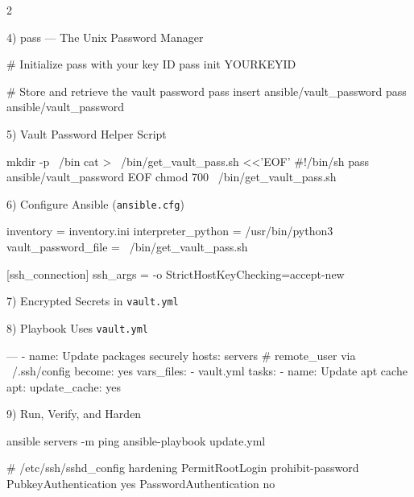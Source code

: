 \documentclass[8pt,letterpaper]{article}
\begin{document}
\begin{multicols}{2}
\begin{secbox}{4) pass --- The Unix Password Manager}
\begin{codeblock}
# Initialize pass with your key ID
pass init YOURKEYID

# Store and retrieve the vault password
pass insert ansible/vault_password
pass ansible/vault_password
\end{codeblock}
\end{secbox}

\begin{secbox}{5) Vault Password Helper Script}
\begin{codeblock}
mkdir -p ~/bin
cat > ~/bin/get_vault_pass.sh <<'EOF'
#!/bin/sh
pass ansible/vault_password
EOF
chmod 700 ~/bin/get_vault_pass.sh
\end{codeblock}
\end{secbox}

\begin{secbox}{6) Configure Ansible (\texttt{ansible.cfg})}
\begin{codeblock}
[defaults]
inventory           = inventory.ini
interpreter_python  = /usr/bin/python3
vault_password_file = ~/bin/get_vault_pass.sh

[ssh_connection]
ssh_args = -o StrictHostKeyChecking=accept-new
\end{codeblock}
\end{secbox}

\begin{secbox}{7) Encrypted Secrets in \texttt{vault.yml}}
\end{secbox}

\begin{secbox}{8) Playbook Uses \texttt{vault.yml}}
\begin{codeblock}
---
- name: Update packages securely
  hosts: servers     # remote_user via ~/.ssh/config
  become: yes
  vars_files:
    - vault.yml
  tasks:
    - name: Update apt cache
      apt:
        update_cache: yes
\end{codeblock}
\end{secbox}

\begin{secbox}{9) Run, Verify, and Harden}
\begin{codeblock}
ansible servers -m ping
ansible-playbook update.yml

# /etc/ssh/sshd_config hardening
PermitRootLogin      prohibit-password
PubkeyAuthentication yes
PasswordAuthentication no
\end{codeblock}
\end{secbox}

\end{multicols}
\end{document}
